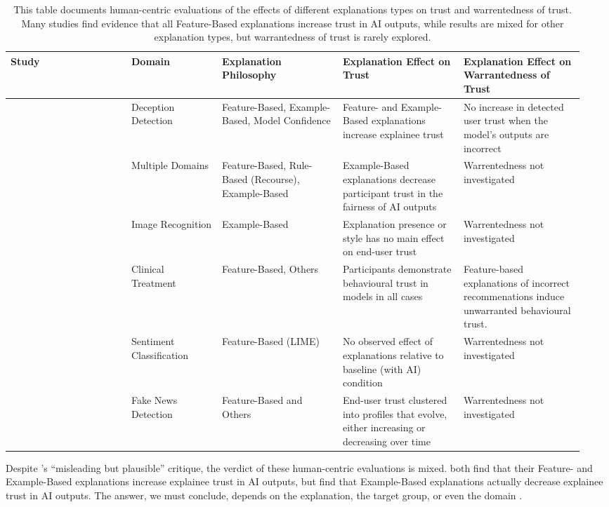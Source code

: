 \begin{table}[htbp]
    \centering
    \caption{This table documents human-centric evaluations of the effects of different explanations types on trust and warrentedness of trust. Many studies find evidence that all Feature-Based explanations increase trust in AI outputs, while results are mixed for other explanation types, but warrantedness of trust is rarely explored.}
    \begin{tabular}{p{0.2\linewidth} p{0.15\linewidth} p{0.2\linewidth} p{0.2\linewidth} p{0.2\linewidth}}
        \toprule
        Study & Domain & Explanation Philosophy & Explanation Effect on Trust & Explanation Effect on Warrantedness of Trust \\
        \midrule
        \textcite{lai_human_2019} & Deception Detection & Feature-Based, Example-Based, Model Confidence & Feature- and Example-Based explanations increase explainee trust & No increase in detected user trust when the model's outputs are incorrect \\
        \textcite{binns_its_2018} & Multiple Domains & Feature-Based, Rule-Based (Recourse), Example-Based & Example-Based explanations decrease participant trust in the fairness of AI outputs & Warrentedness not investigated \\
        \textcite{ford_play_2020} & Image Recognition & Example-Based & Explanation presence or style has no main effect on end-user trust & Warrentedness not investigated \\
        \textcite{jacobs_how_2021} & Clinical Treatment & Feature-Based, Others & Participants demonstrate behavioural trust in models in all cases & Feature-based explanations of incorrect recommenations induce unwarranted behavioural trust. \\
        \textcite{bansal_does_2021} & Sentiment Classification & Feature-Based (LIME) & No observed effect of explanations relative to baseline (with AI) condition & Warrentedness not investigated \\
        \textcite{mohseni_trust_nodate} & Fake News Detection & Feature-Based and Others & End-user trust clustered into profiles that evolve, either increasing or decreasing over time & Warrentedness not investigated \\
        \bottomrule
    \end{tabular}
    \label{tab:studies}
\end{table}

Despite \textcite{Lipton}'s ``misleading but plausible'' critique, the verdict of these human-centric evaluations is mixed. \textcite{lai_human_2019,jacobs_how_2021} both find that their Feature- and Example-Based explanations increase explainee trust in AI outputs, but \textcite{binns_its_2018} find that Example-Based explanations actually decrease explainee trust in AI outputs. The answer, we must conclude, depends on the explanation, the target group, or even the domain \cite{mohseni_trust_nodate}. 

